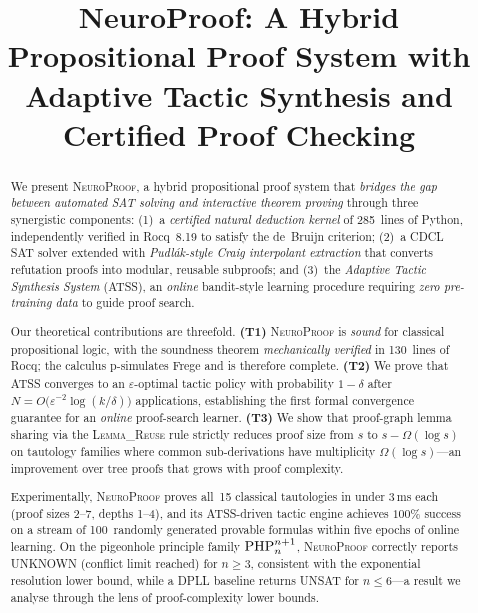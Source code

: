\documentclass[conference]{IEEEtran}
\newcommand{\NP}{\textsc{NeuroProof}}
\newcommand{\ATSS}{\textsc{ATSS}}
\newcommand{\PHP}{\textnormal{PHP}}
\begin{document}
\title{NeuroProof: A Hybrid Propositional Proof System with\\
  Adaptive Tactic Synthesis and Certified Proof Checking}

\author{
}

\maketitle

\begin{abstract}
We present \NP{}, a hybrid propositional proof system that
\emph{bridges the gap between automated SAT solving and
interactive theorem proving} through three synergistic components:
(1)~a \emph{certified natural deduction kernel} of 285~lines of
Python, independently verified in Rocq~8.19 to satisfy the
de~Bruijn criterion; (2)~a CDCL SAT solver extended with
\emph{Pudl\'{a}k-style Craig interpolant extraction} that converts
refutation proofs into modular, reusable subproofs; and
(3)~the \emph{Adaptive Tactic Synthesis System} (\ATSS{}), an
\emph{online} bandit-style learning procedure requiring \emph{zero
pre-training data} to guide proof search.

Our theoretical contributions are threefold.
\textbf{(T1)} \NP{} is \emph{sound} for classical propositional logic,
with the soundness theorem \emph{mechanically verified} in 130~lines
of Rocq; the calculus p-simulates Frege and is therefore complete.
\textbf{(T2)} We prove that \ATSS{} converges to an $\varepsilon$-optimal
tactic policy with probability $1-\delta$ after
$N = O\!\bigl(\varepsilon^{-2}\log(k/\delta)\bigr)$
applications, establishing the first formal convergence guarantee for
an \emph{online} proof-search learner.
\textbf{(T3)} We show that proof-graph lemma sharing via the
\textsc{Lemma\_Reuse} rule strictly reduces proof size from $s$ to
$s - \Omega(\log s)$ on tautology families where common sub-derivations
have multiplicity $\Omega(\log s)$---an improvement over tree proofs
that grows with proof complexity.

Experimentally, \NP{} proves all~15 classical tautologies in under
$3$\,ms each (proof sizes 2--7, depths 1--4), and its ATSS-driven
tactic engine achieves $100\%$ success on a stream of 100~randomly
generated provable formulas within five epochs of online learning.
On the pigeonhole principle family $\PHP_n^{n+1}$, \NP{} correctly
reports UNKNOWN (conflict limit reached) for $n \geq 3$, consistent
with the exponential resolution lower bound, while a DPLL baseline
returns UNSAT for $n \leq 6$---a result we analyse through the lens
of proof-complexity lower bounds.
\end{abstract}
\end{document}
